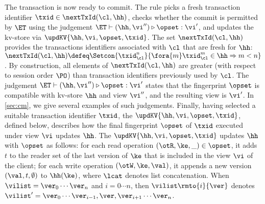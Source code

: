 The transaction is now ready to commit. The rule picks a fresh transaction identifier $\txid \in \nextTxId(\cl, \hh)$, 
checks whether the commit is permitted by $\ET$ using the judgement $\ET \vdash (\hh, \vi'') \triangleright \opset : \vi'$, 
and updates the kv-store via $\updKV{\hh, \vi, \opset, \txid}$. 
The set $\nextTxId(\cl, \hh)$ provides the transactions identifiers
associated with $\cl$ that are fresh for  $\hh$:
$
\nextTxId(\cl, \hh) \defeq \Setcon{\txid_{\cl}^{n}}{\fora{m}
  \txid_{\cl}^{m} \in \hh \Rightarrow m < n }
$.
By construction, all elements of $\nextTxId(\cl, \hh)$ are greater (with respect to session order $\PO$) 
than transaction identifiers previously used by $\cl$. 
The judgement $\ET \vdash (\hh, \vi'') \triangleright \opset : \vi'$
states that the fingerprint $\opset$ is compatible with kv-store $\hh$
and view $\vi''$, and the resulting view is $\vi'$. 
In \cref{sec:cm}, we give several examples of such judgements.
%
%
%
%
Finally, having selected a suitable transaction identifier $\txid$,
the $\updKV{\hh, \vi, \opset, \txid}$, defined below, describes how the final fingerprint $\opset$ of $\txid$ executed 
under view $\vi$ updates $\hh$. 
The $\updKV{\hh, \vi, \opset, \txid}$ updates $\hh$ with $\opset$ as follows: 
for each read operation $(\otR, \ke, \_) \in \opset$, it adds $t$ 
to the reader set of the last version of $\ke$ that is included in the view $\vi$ of the client; 
for each write operation $(\otW, \ke, \val)$, it appends a new version $(\val, t, \emptyset)$ 
to $\hh(\ke)$, where $\lcat$ denotes list concatenation.
When $\vilist = \ver_0 \cdots \ver_n$ and $i=0 \cdots n$, 
then $\vilist\rmto{i}{\ver}$ denotes 
$\vilist' = \ver_0 \cdots \ver_{i-1}, \ver, \ver_{i+1} \cdots \ver_{n}$. 

